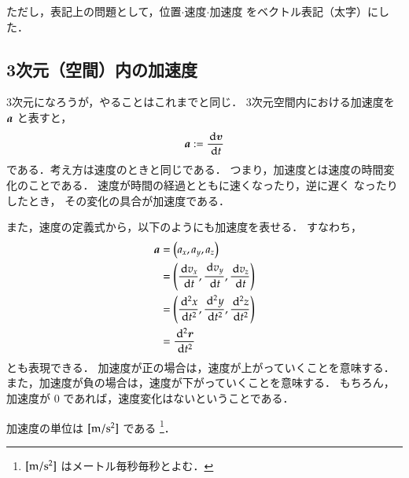             ただし，表記上の問題として，位置$\cdot$速度$\cdot$加速度
            をベクトル表記（太字）にした．

        \subsection{3次元（空間）内の加速度}
            3次元になろうが，やることはこれまでと同じ．
            3次元空間内における加速度を $\textit{\textbf{a}}$ と表すと，
                \begin{align}
                    \textit{\textbf{a}} := \frac{\,\mathrm{d} \boldsymbol{v}}{\,\mathrm{d} t}
                \end{align}
            である．考え方は速度のときと同じである．
            つまり，加速度とは速度の時間変化のことである．
            速度が時間の経過とともに速くなったり，逆に遅く
            なったりしたとき，
            その変化の具合が加速度である．

            また，速度の定義式から，以下のようにも加速度を表せる．
            すなわち，
                \begin{align}
                    \textit{\textbf{a}} &= \left( a_{x} , a_{y} , a_{z} \right) \notag \\
                    &= \left( \frac{\,\mathrm{d} v_{x}}{\,\mathrm{d} t} , \frac{\,\mathrm{d} v_{y}}{\,\mathrm{d} t} ,\frac{\,\mathrm{d} v_{z}}{\,\mathrm{d} t} \right)  \notag \\
                    &= \left( \frac{\,\mathrm{d}^{2}x}{\,\mathrm{d} t^{2}},  \frac{\,\mathrm{d}^{2}y}{\,\mathrm{d} t^{2}},  \frac{\,\mathrm{d}^{2}z}{\,\mathrm{d} t^{2}} \right) \notag \\
                    &= \frac{\,\mathrm{d}^{2}\boldsymbol{r}}{\,\mathrm{d} t^{2}}
                \end{align}
            とも表現できる．
            加速度が正の場合は，速度が上がっていくことを意味する．
            また，加速度が負の場合は，速度が下がっていくことを意味する．
            もちろん，加速度が 0 であれば，速度変化はないということである．

            加速度の単位は $[\rm{m/s^{2}}]$ である
                \footnote{
                    $[\rm{m/s^{2}}]$ はメートル毎秒毎秒とよむ．
                }．


